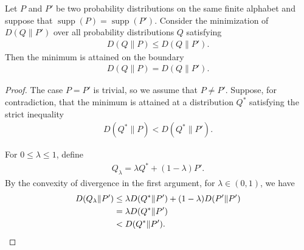 \documentclass[10pt,a4paper]{amsart}
\begin{document}
    \begin{lemma}\label{lem:boundary}
    Let $P$ and $P'$ be two probability distributions on the same finite alphabet and suppose that $\operatorname{supp}(P) = \operatorname{supp}(P')$.
    Consider the minimization of $D(Q\|P')$ over all probability distributions $Q$ satisfying
    \begin{align*}
        D(Q\|P)\leq D(Q\|P').
    \end{align*}
    Then the minimum is attained on the boundary
    \begin{align*}
        D(Q\|P)=D(Q\|P').
    \end{align*}
    \end{lemma}

    \begin{proof}
    The case $P=P'$ is trivial, so we assume that $P\neq P'$.
    Suppose, for contradiction, that the minimum is attained at a distribution $Q^*$ satisfying the strict inequality
    \begin{align*}
        D(Q^*\|P)<D(Q^*\|P').
    \end{align*}
    
    For $0 \leq \lambda \leq 1$, define
    \begin{align*}
        Q_\lambda=\lambda Q^*+(1-\lambda)P'.
    \end{align*}
    By the convexity of divergence in the first argument, for $\lambda \in (0,1)$, we have
    \begin{align}
        D(Q_\lambda\|P')&\leq \lambda D(Q^*\|P')+(1-\lambda)D(P'\|P')\notag\\ 
        &=\lambda D(Q^*\|P')\notag\\
        &< D(Q^*\|P'). \label{eq:divergence to P'}
    \end{align}


\end{proof}
\end{document}
